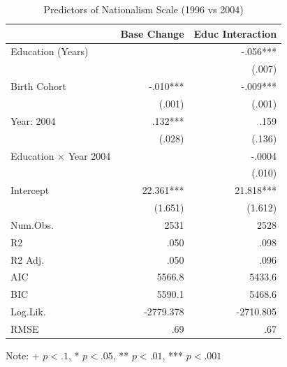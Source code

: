 \begin{table}[htbp]
\centering
\begin{threeparttable}
\caption{Predictors of Nationalism Scale (1996 vs 2004)}
\label{tab:nationalism}
\small
\begin{tabular}{lrr}
\toprule
& Base Change & Educ Interaction \\
\midrule
Education (Years) &  & -.056*** \\
&  & (.007) \\
Birth Cohort & -.010*** & -.009*** \\
& (.001) & (.001) \\
Year: 2004 & .132*** & .159 \\
& (.028) & (.136) \\
Education × Year 2004 &  & -.0004 \\
&  & (.010) \\
Intercept & 22.361*** & 21.818*** \\
& (1.651) & (1.612) \\
Num.Obs. & 2531 & 2528 \\
R2 & .050 & .098 \\
R2 Adj. & .050 & .096 \\
AIC & 5566.8 & 5433.6 \\
BIC & 5590.1 & 5468.6 \\
Log.Lik. & -2779.378 & -2710.805 \\
RMSE & .69 & .67 \\
\bottomrule
\end{tabular}
\begin{tablenotes}
\small
\item Note: + $p < .1$, * $p < .05$, ** $p < .01$, *** $p < .001$
\end{tablenotes}
\end{threeparttable}
\end{table}
